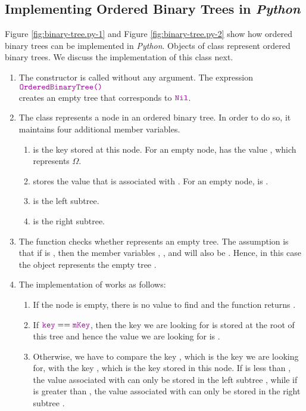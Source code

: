 \subsection{Implementing Ordered Binary Trees in \textsl{Python}}
Figure \ref{fig:binary-tree.py-1} and Figure \ref{fig:binary-tree.py-2} show how ordered binary
trees can be implemented in \textsl{Python}.  Objects of class  represent ordered
binary trees.  We discuss the implementation of this class next.
\begin{enumerate}
\item The constructor is called without any argument.  The expression
      \\[0.2cm]
      \hspace*{1.3cm}
      $\mytt{OrderedBinaryTree()}$
      \\[0.2cm]
      creates an empty tree that corresponds to $\mytt{Nil}$.
\item The class  represents a node in an ordered binary tree.  In order to do so, it
      maintains four additional member variables.
      \begin{enumerate}
      \item {} is the key stored at this node.  For an empty node, 
            has the value , which represents $\Omega$.
      \item {} stores the value that is associated with .  For an empty node,
             is .
      \item {} is the left subtree.  
      \item {} is the right subtree.  
      \end{enumerate}
\item The function  checks whether  represents an empty tree.
      The assumption is that if  is , then the member variables
      , , and  will also be .
      Hence, in this case the object represents the empty tree .
\item The implementation of  works as follows:
      \begin{enumerate}
      \item If the node is empty, there is no value to find and the function returns .
      \item If $\mytt{key} == \mytt{mKey}$, then the key we are looking for is stored at the root of this
            tree and hence the value we are looking for is .
      \item Otherwise, we have to compare the key , which is the key we are looking for,
            with the key , which is the key stored in this node.  If 
            is less than , the value associated with  can only be stored in the left subtree
            , while if  is greater than , the value associated with
             can only be stored in the right subtree .
      \end{enumerate}



\end{enumerate}

